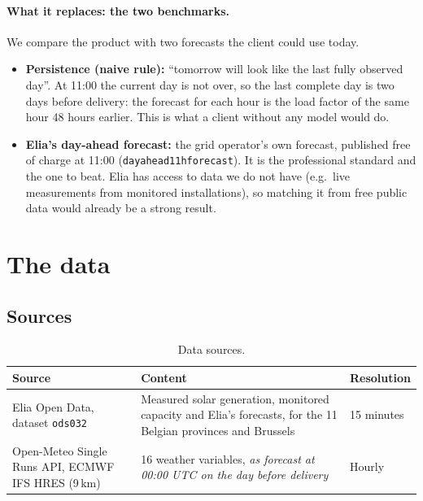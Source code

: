 \documentclass[11pt,a4paper]{article}
\begin{document}
\paragraph{What it replaces: the two benchmarks.}
We compare the product with two forecasts the client could use today.
\begin{itemize}
  \item \textbf{Persistence (naive rule):} ``tomorrow will look like the last fully observed day''.
  At 11:00 the current day is not over, so the last complete day is two days before delivery: the
  forecast for each hour is the load factor of the same hour 48 hours earlier. This is what a client
  without any model would do.
  \item \textbf{Elia's day-ahead forecast:} the grid operator's own forecast, published free of
  charge at 11:00 (\texttt{dayahead11hforecast}). It is the professional standard and the one to
  beat. Elia has access to data we do not have (e.g.\ live measurements from monitored
  installations), so matching it from free public data would already be a strong result.
\end{itemize}

\section{The data}
\label{sec:data}

\subsection{Sources}

\begin{table}[ht]
\centering\small
\caption{Data sources.}
\label{tab:sources}
\begin{tabularx}{\linewidth}{@{}l X l@{}}
\toprule
Source & Content & Resolution \\
\midrule
Elia Open Data, dataset \texttt{ods032} & Measured solar generation, monitored capacity and Elia's forecasts, for the 11 Belgian provinces and Brussels & 15 minutes \\
Open-Meteo Single Runs API, ECMWF IFS HRES (9\,km) & 16 weather variables, \emph{as forecast at 00:00 UTC on the day before delivery} & Hourly \\
\bottomrule
\end{tabularx}
\end{table}
\end{document}
